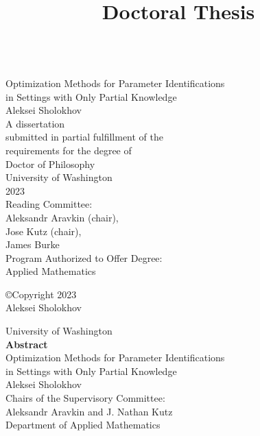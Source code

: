 \documentclass[12pt,a4paper]{book}
\newcommand{\userName}{Aleksei Sholokhov}
\newcommand{\department}{Department of Applied Mathematics}
\newcommand{\institution}{University of Washington}
\newcommand{\doctitle}{Doctoral Thesis}
\newcommand{\projectNameLong}{Optimization Methods for Parameter Identifications \\ in Settings with Only Partial Knowledge}
\numberwithin{equation}{section} %
\numberwithin{figure}{section} %
\numberwithin{table}{section} %
\begin{document}
\thispagestyle{empty}
\title{\doctitle}
~\\
{\center
{\large 
{\large
\projectNameLong
}
\\[10mm]
\userName
\\[15mm]
{A dissertation \\
 submitted in partial fulfillment of the\\ requirements for the degree of}
\\[10mm]
{Doctor of Philosophy}
\\[10mm]
\institution
\\[5mm]
2023
\\[15mm]
{\center
Reading Committee:\\
Aleksandr Aravkin (chair),\\
Jose Kutz (chair), \\
James Burke
}
\\[15mm]
Program Authorized to Offer Degree:
\\[5mm]
Applied Mathematics
\\[5mm]
}
}  

\newpage
\thispagestyle{empty}
{
\center

©Copyright 2023\\
\userName

}

\newpage
\thispagestyle{empty}
{
\center 
\institution
\\[10mm]
\textbf{Abstract}
\\[10mm]
\projectNameLong
\\[10mm]
\userName
\\[10mm]
Chairs of the Supervisory Committee:\\
Aleksandr Aravkin and J. Nathan Kutz\\
\department
\\[10mm]
}
\end{document}
